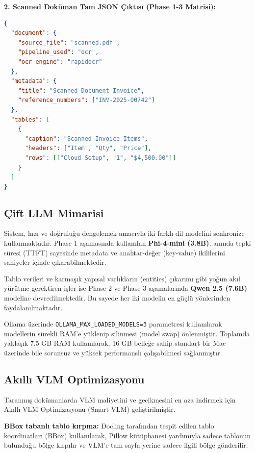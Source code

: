 \documentclass[11pt,a4paper]{article}
\begin{document}
\vspace{4pt}\noindent\textbf{2. Scanned Doküman Tam JSON Çıktısı (Phase 1-3 Matrisi):}\par\vspace{2pt}
\begin{lstlisting}[language=json, basicstyle=\ttfamily\tiny, frame=single, breaklines=true, xleftmargin=0pt, xrightmargin=0pt]
{
  "document": {
    "source_file": "scanned.pdf",
    "pipeline_used": "ocr",
    "ocr_engine": "rapidocr"
  },
  "metadata": {
    "title": "Scanned Document Invoice",
    "reference_numbers": ["INV-2025-00742"]
  },
  "tables": [
    {
      "caption": "Scanned Invoice Items",
      "headers": ["Item", "Qty", "Price"],
      "rows": [["Cloud Setup", "1", "$4,500.00"]]
    }
  ]
}
\end{lstlisting}

\subsection{Çift LLM Mimarisi}
Sistem, hızı ve doğruluğu dengelemek amacıyla iki farklı dil modelini senkronize kullanmaktadır. Phase 1 aşamasında kullanılan \textbf{Phi-4-mini (3.8B)}, anında tepki süresi (TTFT) sayesinde metadata ve anahtar-değer (key-value) ikililerini saniyeler içinde çıkarabilmektedir. 

Tablo verileri ve karmaşık yapısal varlıkların (entities) çıkarımı gibi yoğun akıl yürütme gerektiren işler ise Phase 2 ve Phase 3 aşamalarında \textbf{Qwen 2.5 (7.6B)} modeline devredilmektedir. Bu sayede her iki modelin en güçlü yönlerinden faydalanılmaktadır.

Ollama üzerinde \texttt{OLLAMA\_MAX\_LOADED\_MODELS=3} parametresi kullanılarak modellerin sürekli RAM'e yüklenip silinmesi (model swap) önlenmiştir. Toplamda yaklaşık 7.5 GB RAM kullanılarak, 16 GB belleğe sahip standart bir Mac üzerinde bile sorunsuz ve yüksek performanslı çalışabilmesi sağlanmıştır.

\subsection{Akıllı VLM Optimizasyonu}
Taranmış dokümanlarda VLM maliyetini ve gecikmesini en aza indirmek için Akıllı VLM Optimizasyonu (Smart VLM) geliştirilmiştir.

\textbf{BBox tabanlı tablo kırpma:} Docling tarafından tespit edilen tablo koordinatları (BBox) kullanılarak, Pillow kütüphanesi yardımıyla sadece tablonun bulunduğu bölge kırpılır ve VLM'e tam sayfa yerine sadece ilgili bölge gönderilir.
\end{document}
